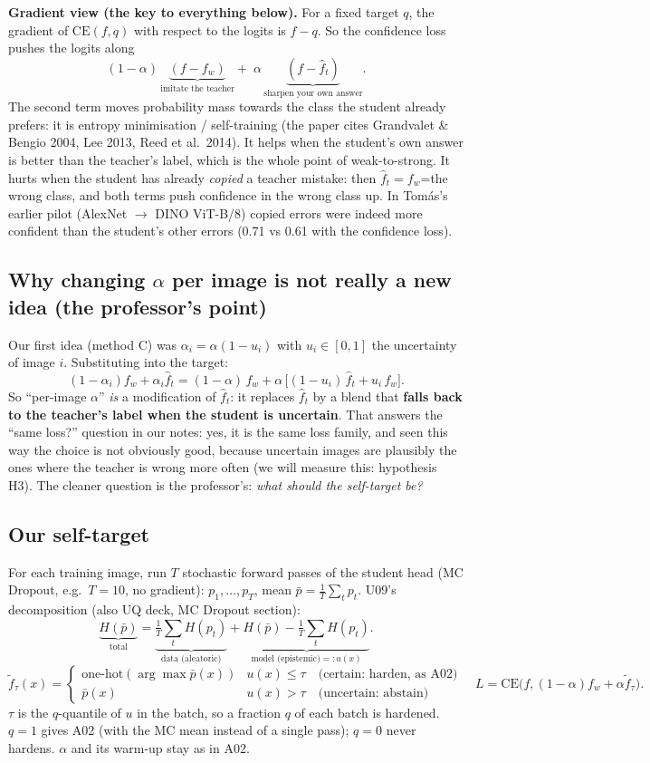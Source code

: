 \documentclass[10pt,a4paper]{article}
\newcommand{\CE}{\mathrm{CE}}
\newcommand{\fw}{f_w}
\newcommand{\fhat}{\hat f_t}
\newcommand{\ftil}{\tilde f_\tau}
\newcommand{\pbar}{\bar p}
\begin{document}
\textbf{Gradient view (the key to everything below).} For a fixed target $q$, the gradient of
$\CE(f,q)$ with respect to the logits is $f-q$. So the confidence loss pushes the logits along
\[
(1-\alpha)\,\underbrace{(f-\fw)}_{\text{imitate the teacher}}+\;\alpha\,\underbrace{(f-\fhat)}_{\text{sharpen your own answer}} .
\]
The second term moves probability mass towards the class the student already prefers: it is entropy
minimisation / self-training (the paper cites Grandvalet \& Bengio 2004, Lee 2013, Reed et al.\ 2014).
It helps when the student's own answer is better than the teacher's label, which is the whole point of
weak-to-strong. It hurts when the student has already \emph{copied} a teacher mistake: then
$\fhat=\fw$=the wrong class, and both terms push confidence in the wrong class up. In Tom\'as's earlier pilot
(AlexNet $\to$ DINO ViT-B/8) copied errors were indeed more confident than the student's other errors
(0.71 vs 0.61 with the confidence loss).

\subsection{Why changing $\alpha$ per image is not really a new idea (the professor's point)}
Our first idea (method C) was $\alpha_i=\alpha(1-u_i)$ with $u_i\in[0,1]$ the uncertainty of image $i$.
Substituting into the target:
\[
(1-\alpha_i)\fw+\alpha_i\fhat=(1-\alpha)\,\fw+\alpha\,\big[(1-u_i)\,\fhat+u_i\,\fw\big].
\]
So ``per-image $\alpha$'' \emph{is} a modification of $\fhat$: it replaces $\fhat$ by a blend that
\textbf{falls back to the teacher's label when the student is uncertain}. That answers the
``same loss?'' question in our notes: yes, it is the same loss family, and seen this way the choice is not
obviously good, because uncertain images are plausibly the ones where the teacher is wrong more often
(we will measure this: hypothesis H3). The cleaner question is the professor's: \emph{what should the
self-target be?}

\subsection{Our self-target}
For each training image, run $T$ stochastic forward passes of the student head (MC Dropout, e.g.\ $T=10$,
no gradient): $p_1,\dots,p_T$, mean $\pbar=\frac1T\sum_tp_t$. U09's decomposition (also UQ deck, MC Dropout
section):
\[
\underbrace{H(\pbar)}_{\text{total}}=\underbrace{\tfrac1T\textstyle\sum_tH(p_t)}_{\text{data (aleatoric)}}+
\underbrace{H(\pbar)-\tfrac1T\textstyle\sum_tH(p_t)}_{\text{model (epistemic)}=:u(x)} .
\]
\[
\ftil(x)=\begin{cases}\text{one-hot}(\arg\max\pbar(x)) & u(x)\le\tau \quad\text{(certain: harden, as A02)}\\
\pbar(x) & u(x)>\tau\quad\text{(uncertain: abstain)}\end{cases}
\quad L=\CE\big(f,(1-\alpha)\fw+\alpha\ftil\big).
\]
$\tau$ is the $q$-quantile of $u$ in the batch, so a fraction $q$ of each batch is hardened. $q=1$ gives A02
(with the MC mean instead of a single pass); $q=0$ never hardens. $\alpha$ and its warm-up stay as in A02.
\end{document}

